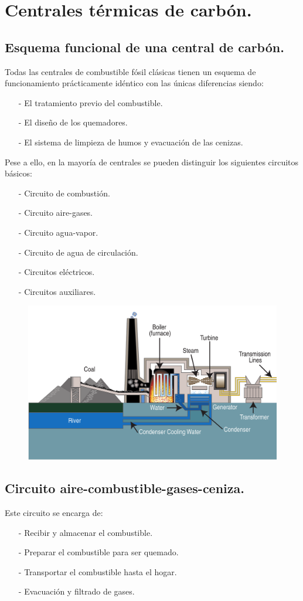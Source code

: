 \chapter{Centrales térmicas de carbón.}
\section{Esquema funcional de una central de carbón.}
Todas las centrales de combustible fósil clásicas tienen un esquema de funcionamiento prácticamente idéntico con las únicas diferencias siendo:
\begin{itemize}
	\item [-] El tratamiento previo del combustible.
	\item [-] El diseño de los quemadores.
	\item [-] El sistema de limpieza de humos y evacuación de las cenizas.
\end{itemize} 


Pese a ello, en la mayoría de centrales se pueden distinguir los siguientes circuitos básicos:
\begin{itemize}
	\item [-] Circuito de combustión.
	\item [-] Circuito aire-gases.
	\item [-] Circuito agua-vapor.
	\item [-] Circuito de agua de circulación.
	\item [-] Circuitos eléctricos.
	\item [-] Circuitos auxiliares.
\end{itemize}


\begin{figure}[H]
	\centering
	\includegraphics[width=0.7\linewidth]{res/tema10/esquemaFuncional}
	\label{fig:esquemafuncional}
\end{figure}

\section{Circuito aire-combustible-gases-ceniza.}
Este circuito se encarga de:
\begin{itemize}
	\item [-] Recibir y almacenar el combustible.
	\item [-] Preparar el combustible para ser quemado.
	\item [-] Transportar el combustible hasta el hogar.
	\item [-] Evacuación y filtrado de gases.
\end{itemize}
